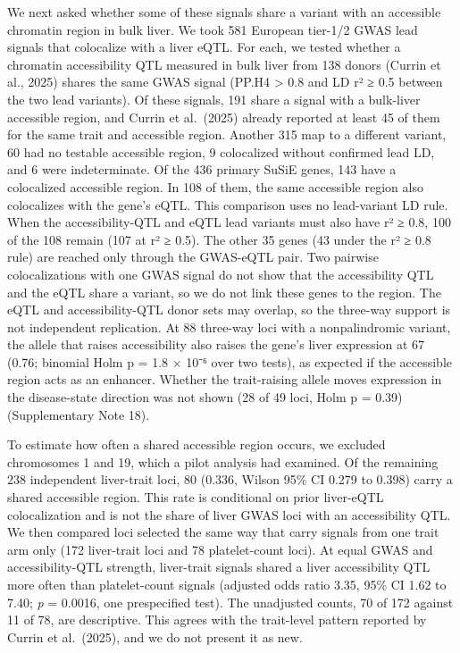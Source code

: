 We next asked whether some of these signals share a variant with an accessible chromatin region in bulk liver. We took 581 European tier-1/2 GWAS lead signals that colocalize with a liver eQTL. For each, we tested whether a chromatin accessibility QTL measured in bulk liver from 138 donors (Currin et al., 2025) shares the same GWAS signal (PP.H4 \textgreater{} 0.8 and LD r² ≥ 0.5 between the two lead variants). Of these signals, 191 share a signal with a bulk-liver accessible region, and Currin et al.~(2025) already reported at least 45 of them for the same trait and accessible region. Another 315 map to a different variant, 60 had no testable accessible region, 9 colocalized without confirmed lead LD, and 6 were indeterminate. Of the 436 primary SuSiE genes, 143 have a colocalized accessible region. In 108 of them, the same accessible region also colocalizes with the gene's eQTL. This comparison uses no lead-variant LD rule. When the accessibility-QTL and eQTL lead variants must also have r² ≥ 0.8, 100 of the 108 remain (107 at r² ≥ 0.5). The other 35 genes (43 under the r² ≥ 0.8 rule) are reached only through the GWAS-eQTL pair. Two pairwise colocalizations with one GWAS signal do not show that the accessibility QTL and the eQTL share a variant, so we do not link these genes to the region. The eQTL and accessibility-QTL donor sets may overlap, so the three-way support is not independent replication. At 88 three-way loci with a nonpalindromic variant, the allele that raises accessibility also raises the gene's liver expression at 67 (0.76; binomial Holm p = 1.8 × 10⁻⁶ over two tests), as expected if the accessible region acts as an enhancer. Whether the trait-raising allele moves expression in the disease-state direction was not shown (28 of 49 loci, Holm p = 0.39) (Supplementary Note 18).

To estimate how often a shared accessible region occurs, we excluded chromosomes 1 and 19, which a pilot analysis had examined. Of the remaining 238 independent liver-trait loci, 80 (0.336, Wilson 95\% CI 0.279 to 0.398) carry a shared accessible region. This rate is conditional on prior liver-eQTL colocalization and is not the share of liver GWAS loci with an accessibility QTL. We then compared loci selected the same way that carry signals from one trait arm only (172 liver-trait loci and 78 platelet-count loci). At equal GWAS and accessibility-QTL strength, liver-trait signals shared a liver accessibility QTL more often than platelet-count signals (adjusted odds ratio 3.35, 95\% CI 1.62 to 7.40; \emph{p} = 0.0016, one prespecified test). The unadjusted counts, 70 of 172 against 11 of 78, are descriptive. This agrees with the trait-level pattern reported by Currin et al.~(2025), and we do not present it as new.

